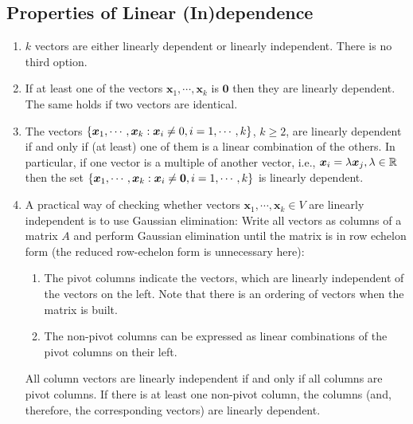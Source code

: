 \subsection{Properties of Linear (In)dependence}
\begin{enumerate}
    \item $k$ vectors are either linearly dependent or linearly independent. There is no third option.
    \hfill \cite{mfml/book/mml/Deisenroth-Faisal-Ong}

    \item If at least one of the vectors $\bm{x}_1, \cdots , \bm{x}_k$ is $\bm{0}$ then they are linearly dependent.
    The same holds if two vectors are identical.
    \hfill \cite{mfml/book/mml/Deisenroth-Faisal-Ong}

    \item The vectors $\left\{\bm{x}_1, \cdots , \bm{x}_k : \bm{x}_i \neq 0, i = 1, \cdots , k\right\}$, $k \geq 2$, are linearly dependent if and only if (at least) one of them is a linear combination of the others.
    In particular, if one vector is a multiple of another vector, i.e., $\bm{x}_i = \lambda \bm{x}_j , \lambda \in \mathbb{R}$ then the set $\left\{\bm{x}_1, \cdots , \bm{x}_k : \bm{x}_i \neq \bm{0}, i = 1, \cdots , k\right\}$ is linearly dependent.
    \hfill \cite{mfml/book/mml/Deisenroth-Faisal-Ong}

    \item A practical way of checking whether vectors $\bm{x}_1, \cdots , \bm{x}_k \in V$ are linearly independent is to use Gaussian elimination:
    Write all vectors as columns of a matrix $A$ and perform Gaussian elimination until the matrix is in row echelon form (the reduced row-echelon form is unnecessary here):
    \hfill \cite{mfml/book/mml/Deisenroth-Faisal-Ong}
    \begin{enumerate}
        \item The pivot columns indicate the vectors, which are linearly independent of the vectors on the left. Note that there is an ordering of vectors when the matrix is built.
        \hfill \cite{mfml/book/mml/Deisenroth-Faisal-Ong}

        \item The non-pivot columns can be expressed as linear combinations of the pivot columns on their left.
        \hfill \cite{mfml/book/mml/Deisenroth-Faisal-Ong}
    \end{enumerate}

    All column vectors are linearly independent if and only if all columns are pivot columns. If there is at least one non-pivot column, the columns (and, therefore, the corresponding vectors) are linearly dependent.
    \hfill \cite{mfml/book/mml/Deisenroth-Faisal-Ong}


\end{enumerate}
